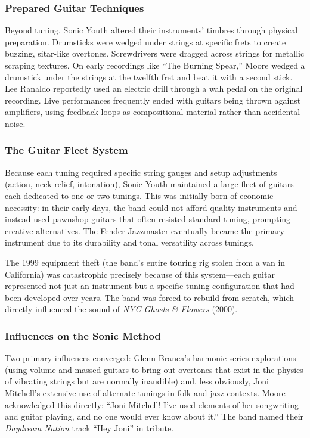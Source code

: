 \documentclass[11pt,letterpaper]{article}
\begin{document}
\subsubsection{Prepared Guitar Techniques}

Beyond tuning, Sonic Youth altered their instruments' timbres through physical preparation. Drumsticks were wedged under strings at specific frets to create buzzing, sitar-like overtones. Screwdrivers were dragged across strings for metallic scraping textures. On early recordings like ``The Burning Spear,'' Moore wedged a drumstick under the strings at the twelfth fret and beat it with a second stick. Lee Ranaldo reportedly used an electric drill through a wah pedal on the original recording. Live performances frequently ended with guitars being thrown against amplifiers, using feedback loops as compositional material rather than accidental noise.

\subsubsection{The Guitar Fleet System}

Because each tuning required specific string gauges and setup adjustments (action, neck relief, intonation), Sonic Youth maintained a large fleet of guitars---each dedicated to one or two tunings. This was initially born of economic necessity: in their early days, the band could not afford quality instruments and instead used pawnshop guitars that often resisted standard tuning, prompting creative alternatives. The Fender Jazzmaster eventually became the primary instrument due to its durability and tonal versatility across tunings.

The 1999 equipment theft (the band's entire touring rig stolen from a van in California) was catastrophic precisely because of this system---each guitar represented not just an instrument but a specific tuning configuration that had been developed over years. The band was forced to rebuild from scratch, which directly influenced the sound of \textit{NYC Ghosts \& Flowers} (2000).

\subsubsection{Influences on the Sonic Method}

Two primary influences converged: Glenn Branca's harmonic series explorations (using volume and massed guitars to bring out overtones that exist in the physics of vibrating strings but are normally inaudible) and, less obviously, Joni Mitchell's extensive use of alternate tunings in folk and jazz contexts. Moore acknowledged this directly: ``Joni Mitchell! I've used elements of her songwriting and guitar playing, and no one would ever know about it.'' The band named their \textit{Daydream Nation} track ``Hey Joni'' in tribute.
\end{document}
